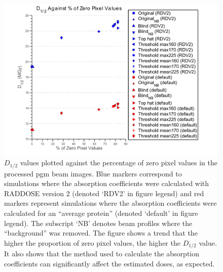 \begin{figure}
  \centering
    \includegraphics[width=1\textwidth]{figures/beam/d_half_plot.pdf}
    \caption[$D_{1/2}$ values plotted against the percentage of zero pixel values in the processed pgm beam images.]{$D_{1/2}$ values plotted against the percentage of zero pixel values in the processed pgm beam images.
    Blue markers correspond to simulations where the absorption coefficients were calculated with RADDOSE version 2 (denoted `RDV2' in figure legend) and red markers represent simulations where the absorption coefficients were calculated for an ``average protein'' (denoted `default' in figure legend).
    The subscript `NB' denotes beam profiles where the ``background'' was removed.
    The figure shows a trend that the higher the proportion of zero pixel values, the higher the $D_{1/2}$ value.
    It also shows that the method used to calculate the absorption coefficients can significantly affect the estimated doses, as expected.}
    \label{figdhalf}
\end{figure}
